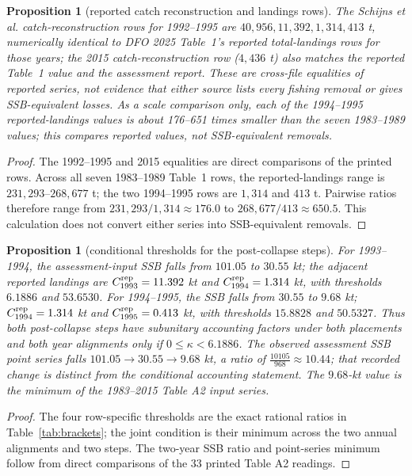 \documentclass[10pt,twocolumn]{article}
\theoremstyle{plain}
\newtheorem{proposition}[theorem]{Proposition}
\theoremstyle{remark}
\begin{document}
\begin{proposition}[reported catch reconstruction and landings rows]
\label{prop:catchrecord}
The Schijns et al. catch-reconstruction rows for 1992--1995 are \(40{,}956, 11{,}392, 1{,}314, 413\) t, numerically identical to DFO 2025 Table~1's reported total-landings rows for those years; the 2015 catch-reconstruction row (\(4{,}436\) t) also matches the reported Table~1 value and the assessment report. These are cross-file equalities of reported series, not evidence that either source lists every fishing removal or gives SSB-equivalent losses. As a scale comparison only, each of the 1994--1995 reported-landings values is about 176--651 times smaller than the seven 1983--1989 values; this compares reported values, not SSB-equivalent removals.
\end{proposition}

\begin{proof}
The 1992--1995 and 2015 equalities are direct comparisons of the printed rows. Across all seven 1983--1989 Table~1 rows, the reported-landings range is \(231{,}293\)--\(268{,}677\) t; the two 1994--1995 rows are \(1{,}314\) and \(413\) t. Pairwise ratios therefore range from \(231{,}293/1{,}314\approx176.0\) to \(268{,}677/413\approx650.5\). This calculation does not convert either series into SSB-equivalent removals.
\end{proof}

\begin{proposition}[conditional thresholds for the post-collapse steps]
\label{prop:experiment}
For 1993--1994, the assessment-input SSB falls from \(101.05\) to \(30.55\) kt; the adjacent reported landings are \(C_{1993}^{\rm rep}=11.392\) kt and \(C_{1994}^{\rm rep}=1.314\) kt, with thresholds \(6.1886\) and \(53.6530\). For 1994--1995, the SSB falls from \(30.55\) to \(9.68\) kt; \(C_{1994}^{\rm rep}=1.314\) kt and \(C_{1995}^{\rm rep}=0.413\) kt, with thresholds \(15.8828\) and \(50.5327\). Thus both post-collapse steps have subunitary accounting factors under both placements and both year alignments only if \(0\le\kappa<6.1886\). The observed assessment SSB point series falls \(101.05\to30.55\to9.68\) kt, a ratio of \(\tfrac{10105}{968}\approx10.44\); that recorded change is distinct from the conditional accounting statement. The \(9.68\)-kt value is the minimum of the 1983--2015 Table A2 input series.
\end{proposition}

\begin{proof}
The four row-specific thresholds are the exact rational ratios in Table~\ref{tab:brackets}; the joint condition is their minimum across the two annual alignments and two steps. The two-year SSB ratio and point-series minimum follow from direct comparisons of the 33 printed Table A2 readings.
\end{proof}
\end{document}
